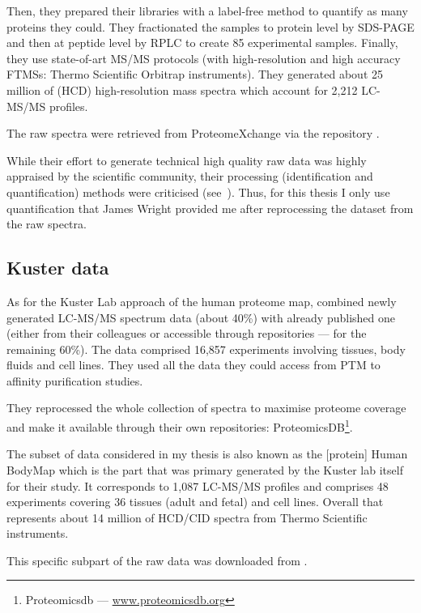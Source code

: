 Then, they prepared their libraries with a label-free method to quantify
as many proteins they could. They fractionated the samples to protein level by
\gls{SDS-PAGE} and then at peptide level by \gls{RPLC} to create 85 experimental
samples. Finally, they use state-of-art \gls{MS/MS} protocols
(with high-resolution and high accuracy \glspl{FTMS}:
Thermo Scientific Orbitrap instruments).
They generated about 25 million of (\gls{HCD})
high-resolution mass spectra which account for 2,212 \gls{LC-MS/MS} profiles.

The raw spectra were retrieved from ProteomeXchange via the repository
.

While their effort to generate technical high quality raw data was highly
appraised by the scientific community, their processing
(identification and quantification) methods were
criticised (see~\cite{Ezkurdia2014-qx}). Thus, for this thesis I only use
quantification that James Wright provided me after reprocessing the dataset
from the raw spectra.

\subsection{Kuster data}

As for the Kuster Lab approach of the human proteome map,
\cite{KusterData} combined newly generated \gls{LC-MS/MS} spectrum
data (about 40\%) with already published one
(either from their colleagues or accessible through repositories ---
for the remaining 60\%).
The data comprised 16,857 experiments involving tissues, body fluids and cell
lines. They used all the data they could access from \gls{PTM} to affinity
purification studies.

They reprocessed the whole collection of spectra to maximise proteome coverage
and make it available through their own repositories: ProteomicsDB\footnote{%
Proteomicsdb --- %
\href{https://www.proteomicsdb.org/}{www.proteomicsdb.org}}.

The subset of data considered in my thesis is also
known as the [protein] Human BodyMap which is the part that was primary generated
by the Kuster lab itself for their study. It corresponds to 1,087 \gls{LC-MS/MS}
profiles and comprises 48 experiments covering 36 tissues (adult and fetal) and
cell lines. Overall that represents about 14 million of \gls{HCD}/\gls{CID}
spectra from Thermo Scientific instruments.

This specific subpart of the raw data was downloaded from .

